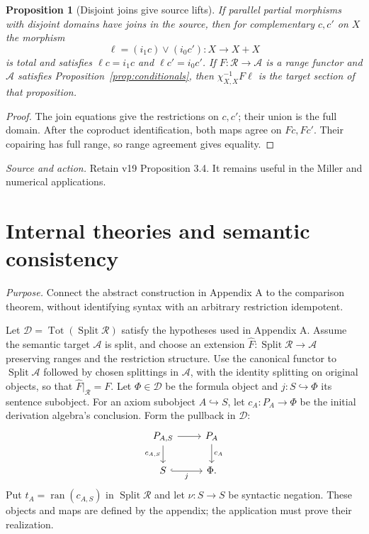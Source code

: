 \documentclass[11pt]{article}
\newtheorem{proposition}[theorem]{Proposition}
\theoremstyle{definition}\newtheorem{definition}[theorem]{Definition}
\newcommand{\Tot}{\operatorname{Tot}}
\newcommand{\Split}{\operatorname{Split}}
\newcommand{\ran}{\operatorname{ran}}
\newcommand{\R}{\mathscr R}
\newcommand{\A}{\mathcal A}
\newcommand{\D}{\mathcal D}
\newcommand{\source}[1]{\par\smallskip\noindent\textit{Source and action.} #1\par\smallskip}
\newcommand{\purpose}[1]{\noindent\textit{Purpose.} #1\par\medskip}
\begin{document}
\begin{proposition}[Disjoint joins give source lifts]\label{prop:joins}
If parallel partial morphisms with disjoint domains have joins in
the source, then for complementary $c,c'$ on $X$ the morphism
\[
 \ell=(i_1c)\vee(i_0c'):X\to X+X
\]
is total and satisfies $\ell c=i_1c$ and $\ell c'=i_0c'$.
If $F:\R\to\A$ is a range functor and $\A$ satisfies
Proposition~\ref{prop:conditionals}, then
$\chi_{X,X}^{-1}F\ell$ is the target section of that proposition.
\end{proposition}
\begin{proof}
The join equations give the restrictions on $c,c'$; their union
is the full domain. After the coproduct identification, both maps agree on
$Fc,Fc'$. Their copairing has full range, so range agreement gives
equality.
\end{proof}
\source{Retain v19 Proposition 3.4. It remains useful in the Miller and numerical applications.}

\section{Internal theories and semantic consistency}
\purpose{Connect the abstract construction in Appendix A to the comparison theorem, without identifying syntax with an arbitrary restriction idempotent.}
Let $\D=\Tot(\Split\R)$ satisfy the hypotheses used in Appendix A.
Assume the semantic target $\A$ is split, and choose an extension
$\widehat F:\Split\R\to\A$ preserving ranges and the restriction
structure. Use the canonical functor to $\Split\A$ followed by
chosen splittings in $\A$, with the identity splitting on original
objects, so that $\widehat F|_{\R}=F$.
Let $\Phi\in\D$ be the formula object and $j:S\hookrightarrow\Phi$
its sentence subobject. For an axiom subobject $A\hookrightarrow S$,
let $c_A:P_A\to\Phi$ be the initial derivation algebra's conclusion.
Form the pullback in $\D$:
\[
\begin{tikzcd}
 P_{A,S}\arrow[r]\arrow[d,"c_{A,S}"']&P_A\arrow[d,"c_A"]\\
 S\arrow[r,hook,"j"']&\Phi.
\end{tikzcd}
\]
Put $t_A=\ran(c_{A,S})$ in $\Split\R$ and let
$\nu:S\to S$ be syntactic negation. These objects and maps are
defined by the appendix; the application must prove their realization.
\end{document}
